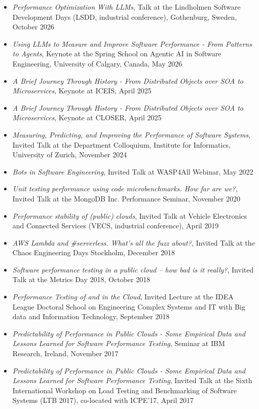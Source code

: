 \documentclass[paper=letter,fontsize=11pt]{scrartcl} %
\begin{document}
\begin{itemize}
  \item \emph{Performance Optimization With LLMs}, Talk at the Lindholmen Software Development Days (LSDD, industrial conference), Gothenburg, Sweden, October 2026
  \item \emph{Using LLMs to Measure and Improve Software Performance - From Patterns to Agents}, Keynote at the Spring School on Agentic AI in Software Engineering, University of Calgary, Canada, May 2026
  \item \emph{A Brief Journey Through History - From Distributed Objects over SOA to Microservices}, Keynote at ICEIS, April 2025
  \item \emph{A Brief Journey Through History - From Distributed Objects over SOA to Microservices}, Keynote at CLOSER, April 2025
  \item \emph{Measuring, Predicting, and Improving the Performance of Software Systems}, Invited Talk at the Department Colloquium, Institute for Informatics, University of Zurich, November 2024
  \item \emph{Bots in Software Engineering}, Invited Talk at WASP4All Webinar, May 2022
  \item \emph{Unit testing performance using code microbenchmarks. How far are we?}, Invited Talk at the MongoDB Inc. Performance Seminar, November 2020
	\item \emph{Performance stability of (public) clouds}, Invited Talk at Vehicle Electronics and Connected Services (VECS, industrial conference), April 2019
	\item \emph{AWS Lambda and \#serverless. What’s all the fuzz about?}, Invited Talk at the Chaos Engineering Days Stockholm, December 2018
		\item \emph{Software performance testing in a public cloud – how bad is it really?}, Invited Talk at the Metrics Day 2018, October 2018
		\item \emph{Performance Testing of and in the Cloud}, Invited Lecture at the IDEA League Doctoral School on Engineering Complex Systems and IT with Big data and Information Technology, September 2018
\item \emph{Predictability of Performance in Public Clouds - Some Empirical Data and Lessons Learned for Software Performance Testing}, Seminar at IBM Research, Ireland, November 2017
\item \emph{Predictability of Performance in Public Clouds - Some Empirical Data and Lessons Learned for Software Performance Testing}, Invited Talk at the Sixth International Workshop on Load Testing and Benchmarking of Software Systems (LTB 2017), co-located with ICPE'17, April 2017

\end{itemize}
\end{document}
